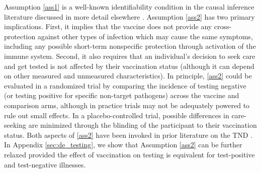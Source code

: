 \documentclass[11pt]{article}
\begin{document}
Assumption \ref{ass1} is a well-known identifiability condition in the causal inference literature discussed in more detail elsewhere \cite{hernan_causal_2020}. Assumption \ref{ass2} has two primary implications. First, it implies that the vaccine does not provide any cross-protection against other types of infection which may cause the same symptoms, including any possible short-term nonspecific protection through activation of the immune system. Second, it also requires that an individual's decision to seek care and get tested is not affected by their vaccination status (although it can depend on other measured and unmeasured characteristics). In principle, \ref{ass2} could be evaluated in a randomized trial by comparing the incidence of testing negative (or testing positive for specific non-target pathogens) across the vaccine and comparison arms, although in practice trials may not be adequately powered to rule out small effects. In a placebo-controlled trial, possible differences in care-seeking are minimized through the blinding of the participant to their vaccination status. Both aspects of \ref{ass2} have been invoked in prior literature on the TND \cite{jackson_test-negative_2013,feng_assessment_2017,schnitzer_estimands_2022}. In Appendix \ref{sec:de_testing}, we show that Assumption \ref{ass2} can be further relaxed provided the effect of vaccination on testing is equivalent for test-positive and test-negative illnesses.
\end{document}
